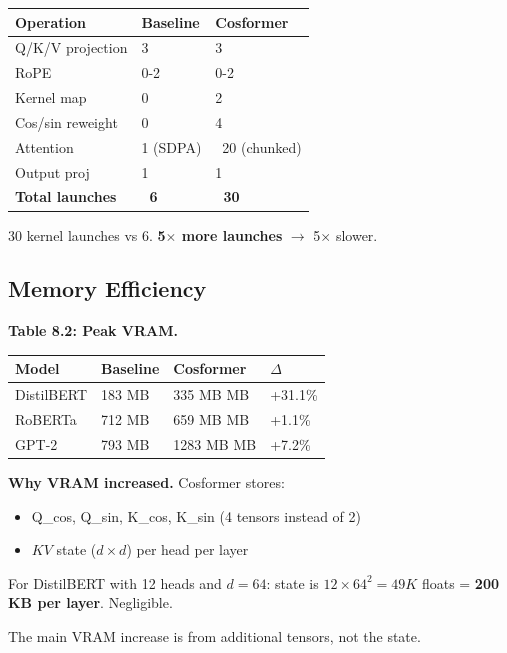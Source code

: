 \begin{table}[H]
\centering
\small
\begin{tabular}{lll}
\toprule
\textbf{Operation} & \textbf{Baseline} & \textbf{Cosformer} \\
\midrule
Q/K/V projection & 3 & 3 \\
RoPE & 0-2 & 0-2 \\
Kernel map & 0 & 2 \\
Cos/sin reweight & 0 & 4 \\
Attention & 1 (SDPA) & ~20 (chunked) \\
Output proj & 1 & 1 \\
\textbf{Total launches} & \textbf{~6} & \textbf{~30} \\
\bottomrule
\end{tabular}
\end{table}

30 kernel launches vs 6. \textbf{5$\times$ more launches} $\to$ 5$\times$ slower.

\subsection{Memory Efficiency}

\textbf{Table 8.2: Peak VRAM.}

\begin{table}[H]
\centering
\small
\begin{tabular}{llll}
\toprule
\textbf{Model} & \textbf{Baseline} & \textbf{Cosformer} & \textbf{$\Delta$} \\
\midrule
DistilBERT & 183 MB & 335 MB MB & +31.1\% \\
RoBERTa & 712 MB & 659 MB MB & +1.1\% \\
GPT-2 & 793 MB & 1283 MB MB & +7.2\% \\
\bottomrule
\end{tabular}
\end{table}

\textbf{Why VRAM increased.} Cosformer stores:
\begin{itemize}
\item Q\_cos, Q\_sin, K\_cos, K\_sin (4 tensors instead of 2)
\item $KV$ state ($d \times d$) per head per layer

\end{itemize}
For DistilBERT with 12 heads and $d = 64$: state is $12 \times 64^2 = 49K$ 
floats = \textbf{200 KB per layer}. Negligible.

The main VRAM increase is from additional tensors, not the state.

